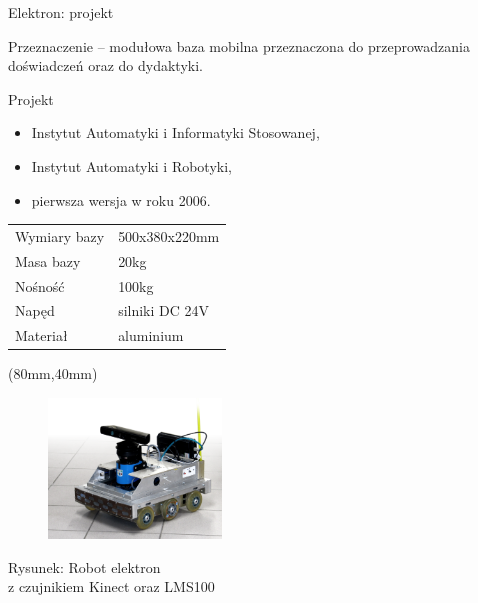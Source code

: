 \documentclass[xcolor=x11names,compress]{beamer}
\renewcommand{\(}{\begin{columns}}
\renewcommand{\)}{\end{columns}}
\newcommand{\<}[1]{\begin{column}{#1}}
\renewcommand{\>}{\end{column}}
\begin{document}
\begin{frame}{Elektron: projekt}

    \vspace{.1cm}

    \alert{Przeznaczenie} -- modułowa baza mobilna przeznaczona do przeprowadzania
    doświadczeń oraz do dydaktyki.

    \vspace{.4cm}

    \alert{Projekt}
    \begin{itemize}
    \item Instytut Automatyki i Informatyki Stosowanej,
    \item Instytut Automatyki i Robotyki,
    \item pierwsza wersja w roku 2006.
    \end{itemize}

    \vspace{.4cm}

    \begin{tabular}{ll}
    \alert{Wymiary bazy} & 500x380x220mm\\
    \alert{Masa bazy} & 20kg\\
    \alert{Nośność} & 100kg\\
    \alert{Napęd} & silniki DC 24V\\
    \alert{Materiał} & aluminium\\
    \end{tabular}

    \begin{textblock*}{50mm}(80mm,40mm)%
    \begin{minipage}[l]{50mm}%
    \centering
    \begin{figure}[h!]
    \centering
    \includegraphics[width=4.6cm]{../Common/img/elektron/elektron_kinect}
    \end{figure}
    \scriptsize
    \alert{Rysunek:} Robot elektron\\z czujnikiem Kinect oraz LMS100

    \end{minipage}
    \end{textblock*}

\end{frame}
\end{document}
